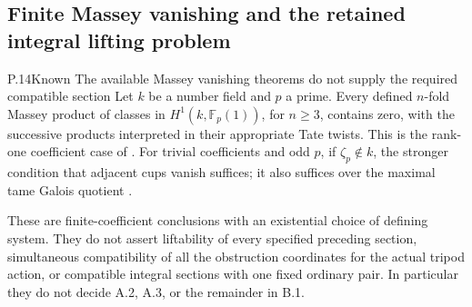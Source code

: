 \subsection{Finite Massey vanishing and the retained integral lifting problem}

\begin{result}{P.14}{Known}
{The available Massey vanishing theorems do not supply the required compatible section}
Let $k$ be a number field and $p$ a prime.  Every defined $n$-fold
Massey product of classes in $H^1(k,\mathbb F_p(1))$, for $n\ge3$,
contains zero, with the successive products interpreted in their
appropriate Tate twists.  This is the rank-one coefficient case of
\citet[Theorem 7.4, author p.27]{RootHarpazWittenberg2023}.
For trivial coefficients and odd $p$, if $\zeta_p\notin k$, the
stronger condition that adjacent cups vanish suffices; it also
suffices over the maximal tame Galois quotient
\citep[Theorem 1.1]{RootMaireMinacRamakrishnaTan2026}.

These are finite-coefficient conclusions with an existential choice
of defining system.  They do not assert liftability of every specified
preceding section, simultaneous compatibility of all the obstruction
coordinates for the actual tripod action, or compatible integral
sections with one fixed ordinary pair.  In particular they do not
decide A.2, A.3, or the remainder in B.1.
\end{result}

